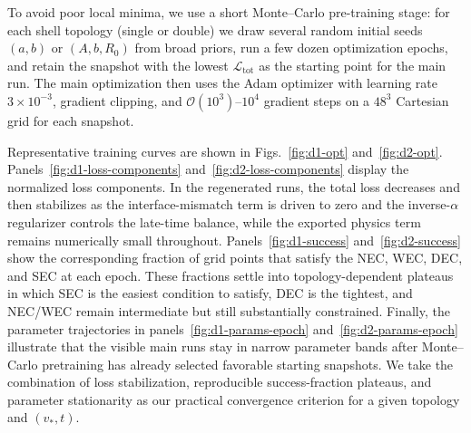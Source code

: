 \documentclass[11pt]{article}
\begin{document}
To avoid poor local minima, we use a short Monte--Carlo pre-training stage: for each shell topology (single or double) we draw several random initial seeds $(a,b)$ or $(A,b,R_0)$ from broad priors, run a few dozen optimization epochs, and retain the snapshot with the lowest $\mathcal{L}_\text{tot}$ as the starting point for the main run. The main optimization then uses the Adam optimizer with learning rate $3\times10^{-3}$, gradient clipping, and $\mathcal{O}(10^3)$--$10^4$ gradient steps on a $48^3$ Cartesian grid for each snapshot.

Representative training curves are shown in Figs.~\ref{fig:d1-opt} and~\ref{fig:d2-opt}. Panels~\ref{fig:d1-loss-components} and~\ref{fig:d2-loss-components} display the normalized loss components. In the regenerated runs, the total loss decreases and then stabilizes as the interface-mismatch term is driven to zero and the inverse-$\alpha$ regularizer controls the late-time balance, while the exported physics term remains numerically small throughout. Panels~\ref{fig:d1-success} and~\ref{fig:d2-success} show the corresponding fraction of grid points that satisfy the NEC, WEC, DEC, and SEC at each epoch. These fractions settle into topology-dependent plateaus in which SEC is the easiest condition to satisfy, DEC is the tightest, and NEC/WEC remain intermediate but still substantially constrained. Finally, the parameter trajectories in panels~\ref{fig:d1-params-epoch} and~\ref{fig:d2-params-epoch} illustrate that the visible main runs stay in narrow parameter bands after Monte--Carlo pretraining has already selected favorable starting snapshots. We take the combination of loss stabilization, reproducible success-fraction plateaus, and parameter stationarity as our practical convergence criterion for a given topology and $(v_*,t)$.
\end{document}
